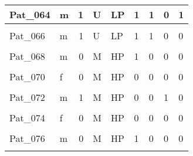 \documentclass[11pt, a4paper, twosided]{book}
\begin{document}
\begin{longtable}[t]{l|l|r|l|l|l|l|l|l}
\hline
Pat\_064 & m & 1 & U & LP & 1 & 1 & 0 & 1\\
\hline
\cellcolor[HTML]{E2E868}{Pat\_065} & \cellcolor[HTML]{E2E868}{m} & \cellcolor[HTML]{E2E868}{0} & \cellcolor[HTML]{E2E868}{U} & \cellcolor[HTML]{E2E868}{LP} & \cellcolor[HTML]{E2E868}{0} & \cellcolor[HTML]{E2E868}{1} & \cellcolor[HTML]{E2E868}{0} & \cellcolor[HTML]{E2E868}{0}\\
\hline
Pat\_066 & m & 1 & U & LP & 1 & 1 & 0 & 0\\
\hline
\cellcolor[HTML]{E2E868}{Pat\_067} & \cellcolor[HTML]{E2E868}{f} & \cellcolor[HTML]{E2E868}{0} & \cellcolor[HTML]{E2E868}{M} & \cellcolor[HTML]{E2E868}{HP} & \cellcolor[HTML]{E2E868}{1} & \cellcolor[HTML]{E2E868}{0} & \cellcolor[HTML]{E2E868}{0} & \cellcolor[HTML]{E2E868}{0}\\
\hline
Pat\_068 & m & 0 & M & HP & 1 & 0 & 0 & 0\\
\hline
\cellcolor[HTML]{E2E868}{Pat\_069} & \cellcolor[HTML]{E2E868}{m} & \cellcolor[HTML]{E2E868}{1} & \cellcolor[HTML]{E2E868}{M} & \cellcolor[HTML]{E2E868}{HP} & \cellcolor[HTML]{E2E868}{1} & \cellcolor[HTML]{E2E868}{0} & \cellcolor[HTML]{E2E868}{0} & \cellcolor[HTML]{E2E868}{0}\\
\hline
Pat\_070 & f & 0 & M & HP & 0 & 0 & 0 & 0\\
\hline
\cellcolor[HTML]{E2E868}{Pat\_071} & \cellcolor[HTML]{E2E868}{f} & \cellcolor[HTML]{E2E868}{0} & \cellcolor[HTML]{E2E868}{U} & \cellcolor[HTML]{E2E868}{LP} & \cellcolor[HTML]{E2E868}{0} & \cellcolor[HTML]{E2E868}{0} & \cellcolor[HTML]{E2E868}{0} & \cellcolor[HTML]{E2E868}{0}\\
\hline
Pat\_072 & m & 1 & M & HP & 0 & 0 & 1 & 0\\
\hline
\cellcolor[HTML]{E2E868}{Pat\_073} & \cellcolor[HTML]{E2E868}{f} & \cellcolor[HTML]{E2E868}{0} & \cellcolor[HTML]{E2E868}{U} & \cellcolor[HTML]{E2E868}{LP} & \cellcolor[HTML]{E2E868}{1} & \cellcolor[HTML]{E2E868}{1} & \cellcolor[HTML]{E2E868}{0} & \cellcolor[HTML]{E2E868}{0}\\
\hline
Pat\_074 & f & 0 & M & HP & 0 & 0 & 0 & 0\\
\hline
\cellcolor[HTML]{E2E868}{Pat\_075} & \cellcolor[HTML]{E2E868}{f} & \cellcolor[HTML]{E2E868}{0} & \cellcolor[HTML]{E2E868}{M} & \cellcolor[HTML]{E2E868}{HP} & \cellcolor[HTML]{E2E868}{1} & \cellcolor[HTML]{E2E868}{0} & \cellcolor[HTML]{E2E868}{0} & \cellcolor[HTML]{E2E868}{0}\\
\hline
Pat\_076 & m & 0 & M & HP & 1 & 0 & 0 & 0\\
\hline
\cellcolor[HTML]{E2E868}{Pat\_077} & \cellcolor[HTML]{E2E868}{f} & \cellcolor[HTML]{E2E868}{0} & \cellcolor[HTML]{E2E868}{U} & \cellcolor[HTML]{E2E868}{NA} & \cellcolor[HTML]{E2E868}{0} & \cellcolor[HTML]{E2E868}{0} & \cellcolor[HTML]{E2E868}{1} & \cellcolor[HTML]{E2E868}{0}\\

\end{longtable}
\end{document}
